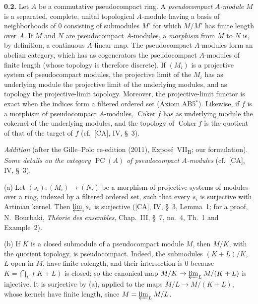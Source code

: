 
\medskip
\noindent\textbf{0.2.}
\label{sga3:VIIB:0.2}
Let \(A\) be a commutative pseudocompact ring. A
\emph{pseudocompact \(A\)-module} \(M\) is a separated, complete, unital
topological \(A\)-module having a basis of neighborhoods of \(0\)
consisting of submodules \(M'\) for which \(M/M'\) has finite length
over \(A\). If \(M\) and \(N\) are pseudocompact \(A\)-modules, a
\emph{morphism} from \(M\) to \(N\) is, by definition, a continuous
\(A\)-linear map. The pseudocompact \(A\)-modules form an abelian
category, which has as cogenerators the pseudocompact \(A\)-modules of
finite length (whose topology is therefore discrete). If \((M_i)\) is a
projective system of pseudocompact modules, the projective limit of the
\(M_i\) has as underlying module the projective limit of the underlying
modules, and as topology the projective-limit topology. Moreover, the
projective-limit functor is exact when the indices form a filtered
ordered set (Axiom AB5\(^*\)). Likewise, if \(f\) is a morphism of
pseudocompact \(A\)-modules, \(\operatorname{Coker}f\) has as underlying
module the cokernel of the underlying modules, and the topology of
\(\operatorname{Coker}f\) is the quotient of that of the target of \(f\)
(cf.\ [CA], IV, \S~3).

\medskip\noindent
\emph{Addition} (after the Gille--Polo re-edition (2011), Expos\'e~VII\textsubscript{B}; our formulation).
\emph{Some details on the category \(\operatorname{PC}(A)\) of pseudocompact \(A\)-modules} (cf.\ [CA],
IV, \S~3).

(a) Let \((s_i)\colon(M_i)\to(N_i)\) be a morphism of projective systems of modules over a ring,
indexed by a filtered ordered set, such that every \(s_i\) is surjective with Artinian kernel. Then
\(\varprojlim_is_i\) is surjective ([CA], IV, \S~3, Lemma~1; for a proof, N.~Bourbaki, \emph{Th\'eorie
des ensembles}, Chap.~III, \S~7, no.~4, Th.~1 and Example~2).

(b) If \(K\) is a closed submodule of a pseudocompact module \(M\), then \(M/K\), with the quotient
topology, is pseudocompact. Indeed, the submodules \((K+L)/K\), \(L\) open in \(M\), have finite
colength, and their intersection is \(0\) because \(K=\bigcap_L(K+L)\) is closed; so the canonical map
\(M/K\to\varprojlim_LM/(K+L)\) is injective. It is surjective by (a), applied to the maps
\(M/L\to M/(K+L)\), whose kernels have finite length, since \(M=\varprojlim_LM/L\).

